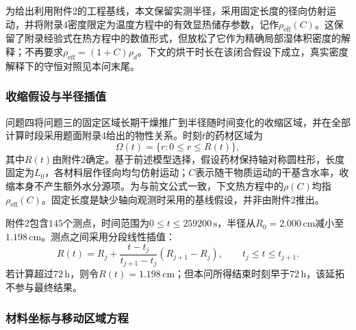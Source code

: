 \documentclass[withoutpreface,bwprint]{cumcmthesis}
\begin{document}
为给出利用附件2的工程基线，本文保留实测半径，采用固定长度的径向仿射运动，并将附录4密度限定为温度方程中的有效显热储存参数，记作$\rho_{\mathrm{eff}}(C)$。这保留了附录经验式在热方程中的数值形式，但放松了它作为精确局部湿体积密度的解释；不再要求$\rho_{\mathrm{eff}}=(1+C)\rho_d$。下文的烘干时长在该闭合假设下成立，真实密度解释下的守恒对照见本问末尾。

\subsubsection{收缩假设与半径插值}

问题四将问题三的固定区域长期干燥推广到半径随时间变化的收缩区域，并在全部计算时段采用题面附录4给出的物性关系。时刻$t$的药材区域为
\begin{equation}
\Omega(t)=\{r:0\le r\le R(t)\},
\label{eq:q4-moving-domain}
\end{equation}
其中$R(t)$由附件2确定。基于前述模型选择，假设药材保持轴对称圆柱形，长度固定为$L_0$，各材料层作径向均匀仿射运动；$C$表示随干物质运动的干基含水率，收缩本身不产生额外水分源项。为与前文公式一致，下文热方程中的$\rho(C)$均指$\rho_{\mathrm{eff}}(C)$。固定长度是缺少轴向观测时采用的基线假设，并非由附件2推出。

附件2包含$145$个测点，时间范围为$0\le t\le259200\,\mathrm s$，半径从$R_0=2.000\,\mathrm{cm}$减小至$1.198\,\mathrm{cm}$。测点之间采用分段线性插值：
\begin{equation}
R(t)
=R_j+
\frac{t-t_j}{t_{j+1}-t_j}
\left(R_{j+1}-R_j\right),
\qquad t_j\le t\le t_{j+1}.
\label{eq:q4-radius-interpolation}
\end{equation}
若计算超过$72\,\mathrm h$，则令$R(t)=1.198\,\mathrm{cm}$；但本问所得结束时刻早于$72\,\mathrm h$，该延拓不参与最终结果。

\subsubsection{材料坐标与移动区域方程}
\end{document}
